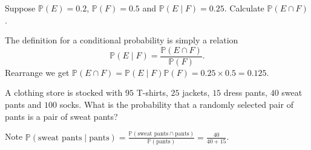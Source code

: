 \documentclass[../main.tex]{subfiles}
\begin{document}
\begin{exercise}
  Suppose \(\mathbb{P}(E) = 0.2\), \(\mathbb{P}(F) = 0.5\) and \(\mathbb{P}(E \mid F) = 0.25\). Calculate \(\mathbb{P}(E \cap F)\).

  \begin{solution}
    The definition for a conditional probability is simply a relation
    \[
      \mathbb{P}(E \mid F) = \frac{\mathbb{P}(E \cap F)}{\mathbb{P}(F)}. 
    \]
    Rearrange we get  \(\mathbb{P}(E \cap F) = \mathbb{P}(E \mid F) \mathbb{P}(F) = 0.25 \times 0.5 = 0.125\).
  \end{solution}
\end{exercise}

\begin{exercise}
  A clothing store is stocked with \(95\) T-shirts, \(25\) jackets, \(15\) dress pants, \(40\) sweat pants and \(100\) socks. 
  What is the probability that a randomly selected pair of pants is a pair of sweat pants?

  \begin{solution}
    Note \(\mathbb{P}(\text{sweat pants} \mid \text{pants}) = \frac{\mathbb{P}(\text{sweat pants} \cap \text{pants})}{\mathbb{P}(\text{pants})} = \frac{40}{40 + 15}\).
  \end{solution}
\end{exercise}
\end{document}
